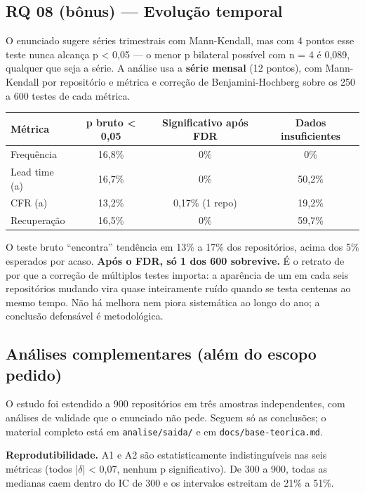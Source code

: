 \documentclass[12pt]{article}
\begin{document}
\subsection{RQ 08 (bônus) — Evolução temporal}

O enunciado sugere séries trimestrais com Mann-Kendall, mas com 4 pontos esse teste nunca alcança p < 0,05 — o menor p bilateral possível com n = 4 é 0,089, qualquer que seja a série. A análise usa a \textbf{série mensal} (12 pontos), com Mann-Kendall por repositório e métrica e correção de Benjamini-Hochberg sobre os 250 a 600 testes de cada métrica.

\begin{table}[!htbp]
\centering
\scriptsize
\begin{tabular}{lccc}
\toprule
\textbf{Métrica} & \textbf{p bruto < 0,05} & \textbf{Significativo após FDR} & \textbf{Dados insuficientes} \\
\midrule
Frequência & 16,8\% & 0\% & 0\% \\
Lead time (a) & 16,7\% & 0\% & 50,2\% \\
CFR (a) & 13,2\% & 0,17\% (1 repo) & 19,2\% \\
Recuperação & 16,5\% & 0\% & 59,7\% \\
\bottomrule
\end{tabular}
\end{table}

O teste bruto ``encontra'' tendência em 13\% a 17\% dos repositórios, acima dos 5\% esperados por acaso. \textbf{Após o FDR, só 1 dos 600 sobrevive.} É o retrato de por que a correção de múltiplos testes importa: a aparência de um em cada seis repositórios mudando vira quase inteiramente ruído quando se testa centenas ao mesmo tempo. Não há melhora nem piora sistemática ao longo do ano; a conclusão defensável é metodológica.

\subsection{Análises complementares (além do escopo pedido)}

O estudo foi estendido a 900 repositórios em três amostras independentes, com análises de validade que o enunciado não pede. Seguem só as conclusões; o material completo está em \texttt{analise/saida/} e em \texttt{docs/base-teorica.md}.

\textbf{Reprodutibilidade.} A1 e A2 são estatisticamente indistinguíveis nas seis métricas (todos |$\delta$| < 0,07, nenhum p significativo). De 300 a 900, todas as medianas caem dentro do IC de 300 e os intervalos estreitam de 21\% a 51\%.
\end{document}
